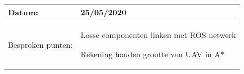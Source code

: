 \begin{tabularx}{\textwidth}{| l | X |}
  \hline
  Datum: & 25/05/2020\\
  \hline
  Besproken punten: &
  \begin{compactitem}
    \item Losse componenten linken met ROS netwerk
    \item Rekening houden grootte van UAV in A*
  \end{compactitem}\\
  \hline
\end{tabularx}
